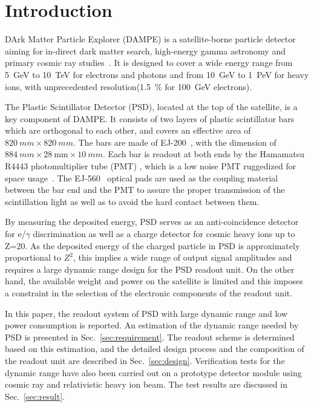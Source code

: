 \documentclass[preprint, times]{elsarticle}
\begin{document}
\section{Introduction}
\label{sec:introduction}

DArk Matter Particle Explorer (DAMPE) is a satellite-borne particle
detector aiming for in-direct dark matter search, high-energy gamma
astronomy and primary cosmic ray studies~\cite{Chang_Jin_dampe}. It is
designed to cover a wide energy range from \SI{5}{GeV} to
\SI{10}{TeV} for electrons and photons and from \SI{10}{GeV} to
\SI{1}{PeV} for heavy ions, with unprecedented
resolution(\SI{1.5}{\percent} for \SI{100}{\giga\electronvolt} electrons).

The Plastic Scintillator Detector (PSD), located at the top of the satellite, is a key component of DAMPE. 
It consists of two layers of plastic scintillator bars which are orthogonal to each other, and covers an effective area of
$\SI{820}{mm}\times\SI{820}{mm}$. 
The bars are made of EJ-200~\cite{scintillator}, with the dimension of $\SI{884}{mm} \times \SI{28}{\milli\meter} \times \SI{10}{mm}$.
Each bar  is readout at both ends by the Hamamatsu R4443 photomultiplier tube (PMT) , which is a low noise PMT ruggedized for space usage~\cite{r4443}. 
The EJ-560~\cite{scintillator} optical pads are used as the  coupling material between the bar end and the PMT to assure the proper transmission of the scintillation light as well as to avoid the hard contact between them.

By measuring the deposited energy, PSD serves as an anti-coincidence detector for e/$\gamma$ discrimination as well as a charge detector for cosmic heavy ions up to Z=20.
As the deposited energy of the charged particle in PSD is approximately proportional to $Z^2$, this implies a wide range of output signal amplitudes and requires a large dynamic range design for the PSD readout unit.
On the other hand, the available weight and power on the satellite is limited and this imposes a constraint in the selection of the electronic components of the readout unit.

In this paper, the readout system of PSD with large dynamic range and  low power consumption is reported.
An estimation of the dynamic range needed by PSD is presented in Sec.~\ref{sec:requirement}.
The readout scheme is determined based on this estimation, and the detailed design process and the composition of the readout unit are described in Sec.~\ref{sec:design}.
Verification tests for the dynamic range have also been carried out on a prototype detector module using cosmic ray and relativistic heavy ion beam.
The test results are discussed in Sec.~\ref{sec:result}.
\end{document}
